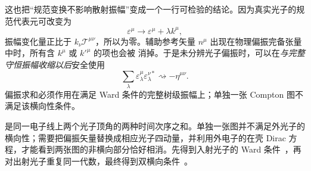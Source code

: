 \begin{exbox}
这也把“规范变换不影响散射振幅”变成一个一行可检验的结论。因为真实光子的规范代表元可改变为
\begin{equation*}
 \varepsilon^\mu\to\varepsilon^\mu+\lambda k^\mu,
\end{equation*}
振幅变化量正比于 $k_\nu\mathcal T^{\mu\nu}$，所以为零。辅助参考矢量 $n^\mu$ 出现在物理偏振完备张量中时，所有含 $k^\mu$ 或 $k'^\mu$ 的项也会被 消掉。于是未分辨光子偏振时，可以在\emph{与完整守恒振幅收缩以后}安全使用
\begin{equation*}
 \sum_\lambda\varepsilon_\lambda^\mu\varepsilon_\lambda^{\nu *}
 \rightsquigarrow-\eta^{\mu\nu}.
\end{equation*}
偏振求和必须作用在满足 Ward 条件的完整树级振幅上；单独一张 Compton 图不满足该横向性条件。


\medskip

 是同一电子线上两个光子顶角的两种时间次序之和。单独一张图并不满足外光子的横向性；需要把偏振矢量替换成相应光子四动量，并利用外电子的在壳 Dirac 方程，才能看到两张图的非横向部分恰好相消。先得到入射光子的 Ward 条件~，再对出射光子重复同一代数，最终得到双横向条件~。



\end{exbox}
